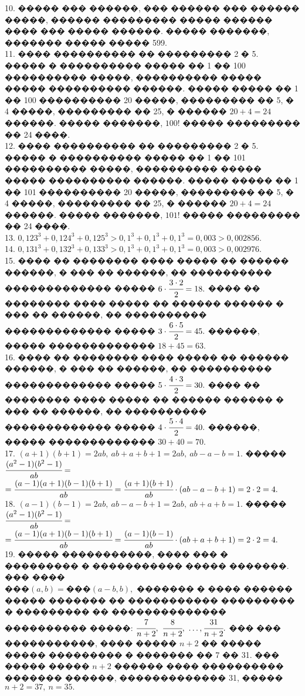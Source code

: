 \documentclass[12pt]{article}
\begin{document}
10. ����� ��� ������, ��� ������ ��� ������ �����, ������ ��������� ����� ������ ���� ��� ����� ������. ����� �������, ������� ����� ����� 599.\\
11. ���� ���������� �� ��������� 2 � 5. ����� � ���������� ����� �� 1 �� 100 ���������� �����, ���������� ����� ����� ���������� ������. ����� ����� �� 1 �� 100 ���������� 20 �����, ��������� �� 5, � 4 �����, ��������� �� 25, � ������ $20+4=24$ ������. ����� �������, $100!$ ����� ��������� �� 24 ����.\\
12. ���� ���������� �� ��������� 2 � 5. ����� � ���������� ����� �� 1 �� 101 ���������� �����, ���������� ����� ����� ���������� ������. ����� ����� �� 1 �� 101 ���������� 20 �����, ��������� �� 5, � 4 �����, ��������� �� 25, � ������ $20+4=24$ ������. ����� �������, $101!$ ����� ��������� �� 24 ����.\\
13. $0,123^3+0,124^3+0,125^3>0,1^3+0,1^3+0,1^3=0,003>0,002856.$\\
14. $0,131^3+0,132^3+0,133^3>0,1^3+0,1^3+0,1^3=0,003>0,002976.$\\
15. ���� �� �������� ���� ����� �� ������ ������, � ��� �� ������, �� ���������� ������������� ����� $6\cdot\cfrac{3\cdot2}{2}=18.$ ���� �� �������� ���� ����� �� ������ ������ � ��� �� ������, �� ���������� ������������� ����� $3\cdot\cfrac{6\cdot5}{2}=45.$ ������, ����� ������������� $18+45=63.$\\
16. ���� �� �������� ���� ����� �� ������ ������, � ��� �� ������, �� ���������� ������������� ����� $5\cdot\cfrac{4\cdot3}{2}=30.$ ���� �� �������� ���� ����� �� ������ ������ � ��� �� ������, �� ���������� ������������� ����� $4\cdot\cfrac{5\cdot4}{2}=40.$ ������, ����� ������������� $30+40=70.$\\
17. $(a+1)(b+1)=2ab,\ ab+a+b+1=2ab,\ ab-a-b=1.$ ����� $\cfrac{(a^2-1)(b^2-1)}{ab}=$\\$=\cfrac{(a-1)(a+1)(b-1)(b+1)}{ab}=\cfrac{(a+1)(b+1)}{ab}\cdot(ab-a-b+1)=2\cdot2=4.$\\
18. $(a-1)(b-1)=2ab,\ ab-a-b+1=2ab,\ ab+a+b=1.$ ����� $\cfrac{(a^2-1)(b^2-1)}{ab}=$\\$=\cfrac{(a-1)(a+1)(b-1)(b+1)}{ab}=\cfrac{(a-1)(b-1)}{ab}\cdot(ab+a+b+1)=2\cdot2=4.$\\
19. ����� �����������, ���� ��� � ��������� � ����������� ����� �������. ��� ����\\ ���$(a,b)=$���$(a-b,b),$ ������� � ���� ������ ����� ������� �� ����������� ��������� � ��������� �� �������������� ���������� �����: $\cfrac{7}{n+2},\ \cfrac{8}{n+2},\ \ldots, \cfrac{31}{n+2}.$ ��� ��� �����������, ���� ����� $n+2$ �� ����� ����� ��������� � ������� �� 7 �� 31. ��� ����� ����� $n+2$ ������ ���� ���������� ������� ������, ������������� 31, ����� $n+2=37,\ n=35.$\\
\end{document}
